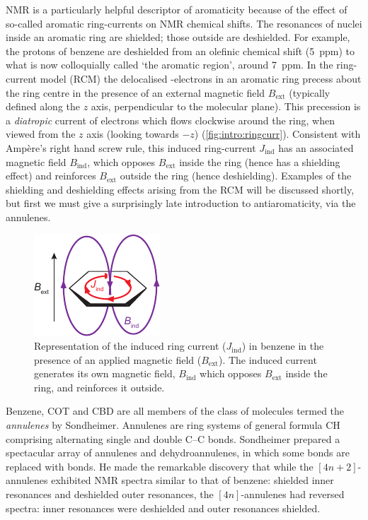 		NMR is a particularly helpful descriptor of aromaticity because of the effect of so-called aromatic ring-currents on NMR chemical shifts. The resonances of nuclei inside an aromatic ring are shielded; those outside are deshielded. For example, the protons of benzene are deshielded from an olefinic chemical shift (5~ppm) to what is now colloquially called `the aromatic region', around 7~ppm. In the ring-current model (RCM) the delocalised \pii{}-electrons in an aromatic ring precess about the ring centre in the presence of an external magnetic field $B_\text{ext}$ (typically defined along the $z$ axis, perpendicular to the molecular plane). This precession is a \textit{diatropic} current of electrons which flows clockwise around the ring, when viewed from the $z$ axis (looking towards $-z$) (\autoref{fig:intro:ringcurr}). Consistent with Amp\`ere's right hand screw rule, this induced ring-current $J_\text{ind}$ has an associated magnetic field $B_\text{ind}$, which opposes $B_\text{ext}$ inside the ring (hence has a shielding effect) and reinforces $B_\text{ext}$ outside the ring (hence deshielding). Examples of the shielding and deshielding effects arising from the RCM will be discussed shortly, but first we must give a surprisingly late introduction to antiaromaticity, via the annulenes.

		\begin{figure}[ht!]
			\centering\includegraphics{figures/intro/ring-current.pdf} 
			\caption[]{Representation of the induced ring current ($J_\text{ind}$) in benzene in the presence of an applied magnetic field  ($B_\text{ext}$). The induced current generates its own magnetic field, $B_\text{ind}$ which opposes $B_\text{ext}$ inside the ring, and reinforces it outside.}
			\label{fig:intro:ringcurr}
		\end{figure}

		Benzene, COT and CBD are all members of the class of molecules termed the \textit{annulenes} by Sondheimer.\autocite{Sondheimer1962} Annulenes are ring systems of general formula CH comprising alternating single and double C--C bonds. Sondheimer prepared a spectacular array of annulenes and dehydroannulenes, in which some  bonds are replaced with  bonds.\autocite{Sondheimer1963,Sondheimer1967,Sondheimer1972} He made the remarkable discovery that while the $[4n+2]$-annulenes exhibited NMR spectra similar to that of benzene:  shielded inner resonances and deshielded outer resonances, the $[4n]$-annulenes had reversed spectra: inner resonances were deshielded and outer resonances shielded.\autocite{Sondheimer1967} 

